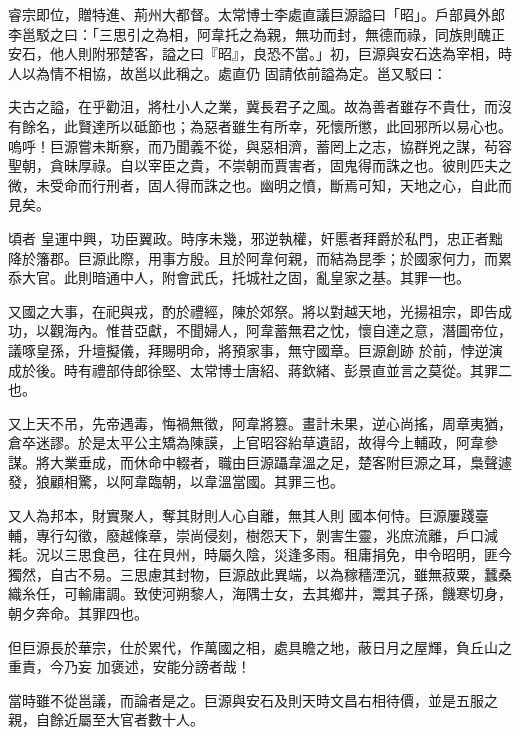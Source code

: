 \begin{pinyinscope}
 睿宗即位，贈特進、荊州大都督。太常博士李處直議巨源謚曰「昭」。戶部員外郎李邕駁之曰：「三思引之為相，阿韋托之為親，無功而封，無德而祿，同族則醜正安石，他人則附邪楚客，謚之曰『昭』，良恐不當。」初，巨源與安石迭為宰相，時人以為情不相協，故邕以此稱之。處直仍
 固請依前謚為定。邕又駁曰：



 夫古之謚，在乎勸沮，將杜小人之業，冀長君子之風。故為善者雖存不貴仕，而沒有餘名，此賢達所以砥節也；為惡者雖生有所幸，死懷所懲，此回邪所以易心也。嗚呼！巨源嘗未斯察，而乃聞義不從，與惡相濟，蓄罔上之志，協群兇之謀，茍容聖朝，貪昧厚祿。自以宰臣之貴，不崇朝而賈害者，固鬼得而誅之也。彼則匹夫之微，未受命而行刑者，固人得而誅之也。幽明之憤，斷焉可知，天地之心，自此而見矣。



 頃者
 皇運中興，功臣翼政。時序未幾，邪逆執權，奸慝者拜爵於私門，忠正者黜降於籓郡。巨源此際，用事方殷。且於阿韋何親，而結為昆季；於國家何力，而累忝大官。此則暗通中人，附會武氏，托城社之固，亂皇家之基。其罪一也。



 又國之大事，在祀與戎，酌於禮經，陳於郊祭。將以對越天地，光揚祖宗，即告成功，以觀海內。惟昔亞獻，不聞婦人，阿韋蓄無君之忱，懷自達之意，潛圖帝位，議啄皇孫，升壇擬儀，拜賜明命，將預家事，無守國章。巨源創跡
 於前，悖逆演成於後。時有禮部侍郎徐堅、太常博士唐紹、蔣欽緒、彭景直並言之莫從。其罪二也。



 又上天不吊，先帝遇毒，悔禍無徵，阿韋將篡。畫計未果，逆心尚搖，周章夷猶，倉卒迷謬。於是太平公主矯為陳謨，上官昭容紿草遺詔，故得今上輔政，阿韋參謀。將大業垂成，而休命中輟者，職由巨源躡韋溫之足，楚客附巨源之耳，梟聲遽發，狼顧相驚，以阿韋臨朝，以韋溫當國。其罪三也。



 又人為邦本，財實聚人，奪其財則人心自離，無其人則
 國本何恃。巨源屢踐臺輔，專行勾徵，廢越條章，崇尚侵刻，樹怨天下，剝害生靈，兆庶流離，戶口減耗。況以三思食邑，往在貝州，時屬久陰，災逢多雨。租庸捐免，申令昭明，匪今獨然，自古不易。三思慮其封物，巨源啟此異端，以為稼穡湮沉，雖無菽粟，蠶桑織糸任，可輸庸調。致使河朔黎人，海隅士女，去其鄉井，鬻其子孫，饑寒切身，朝夕奔命。其罪四也。



 但巨源長於華宗，仕於累代，作萬國之相，處具瞻之地，蔽日月之屋輝，負丘山之重責，今乃妄
 加褒述，安能分謗者哉！



 當時雖不從邕議，而論者是之。巨源與安石及則天時文昌右相待價，並是五服之親，自餘近屬至大官者數十人。




\end{pinyinscope}
